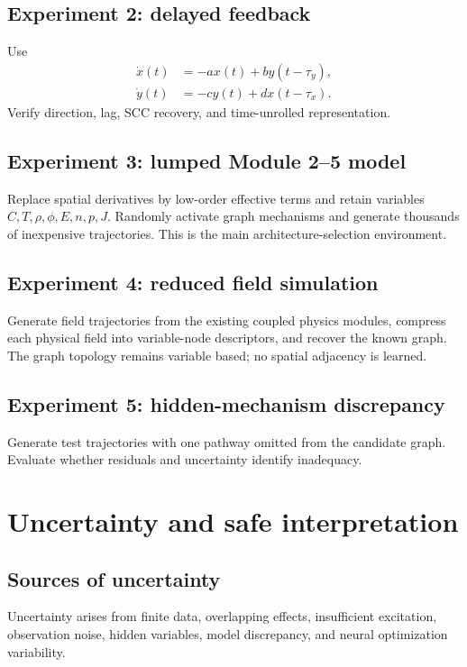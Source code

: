 \documentclass[11pt]{article}
\begin{document}
\subsection{Experiment 2: delayed feedback}

Use
\begin{align}
\dot{x}(t)&=-a x(t)+b y(t-\tau_y),\\
\dot{y}(t)&=-c y(t)+d x(t-\tau_x).
\end{align}
Verify direction, lag, SCC recovery, and time-unrolled representation.

\subsection{Experiment 3: lumped Module 2--5 model}

Replace spatial derivatives by low-order effective terms and retain variables \(C,T,\rho,\phi,E,n,p,J\). Randomly activate graph mechanisms and generate thousands of inexpensive trajectories. This is the main architecture-selection environment.

\subsection{Experiment 4: reduced field simulation}

Generate field trajectories from the existing coupled physics modules, compress each physical field into variable-node descriptors, and recover the known graph. The graph topology remains variable based; no spatial adjacency is learned.

\subsection{Experiment 5: hidden-mechanism discrepancy}

Generate test trajectories with one pathway omitted from the candidate graph. Evaluate whether residuals and uncertainty identify inadequacy.

\section{Uncertainty and safe interpretation}

\subsection{Sources of uncertainty}

Uncertainty arises from finite data, overlapping effects, insufficient excitation, observation noise, hidden variables, model discrepancy, and neural optimization variability.
\end{document}
